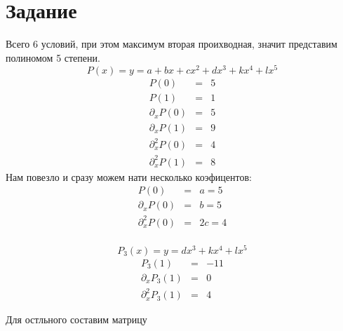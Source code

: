 \section{Задание}
Всего 6 условий, при этом максимум вторая проихводная, значит представим 
полиномом 5 степени.
\begin{equation}
    P(x) = y = a + bx + cx^2 + dx^3 + kx^4 + lx^5
\end{equation}
\begin{eqnarray}
    P(0) &=& 5 \\
    P(1) &=& 1 \\
    \partial_xP(0) &=& 5 \\
    \partial_xP(1) &=& 9 \\
    \partial_x^2P(0) &=& 4 \\
    \partial_x^2P(1) &=& 8
\end{eqnarray}
Нам повезло и сразу можем нати несколько коэфицентов:
\begin{eqnarray}
    P(0) &=& a = 5 \\
    \partial_xP(0) &=& b = 5 \\
    \partial_x^2P(0) &=& 2c = 4 \\
\end{eqnarray}

\begin{equation}
    P_3(x) = y = dx^3 + kx^4 + lx^5
\end{equation}
\begin{eqnarray}
    P_3(1) &=& -11 \\
    \partial_xP_3(1) &=& 0 \\
    \partial_x^2P_3(1) &=& 4
\end{eqnarray}

Для остльного составим матрицу

